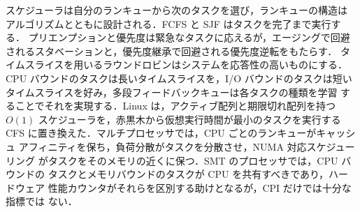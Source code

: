 \documentclass[../main.tex]{subfiles}
\begin{document}
\begin{keypoint}[章のまとめ]
  スケジューラは自分のランキューから次のタスクを選び，ランキューの構造は
  アルゴリズムとともに設計される．FCFS と SJF はタスクを完了まで実行する．
  プリエンプションと優先度は緊急なタスクに応えるが，エージングで回避
  されるスタベーションと，優先度継承で回避される優先度逆転をもたらす．
  タイムスライスを用いるラウンドロビンはシステムを応答性の高いものにする．
  CPU バウンドのタスクは長いタイムスライスを，I/O バウンドのタスクは短い
  タイムスライスを好み，多段フィードバックキューは各タスクの種類を学習
  することでそれを実現する．Linux は，アクティブ配列と期限切れ配列を持つ
  $O(1)$ スケジューラを，赤黒木から仮想実行時間が最小のタスクを実行する
  CFS に置き換えた．マルチプロセッサでは，CPU ごとのランキューがキャッシュ
  アフィニティを保ち，負荷分散がタスクを分散させ，NUMA 対応スケジューリング
  がタスクをそのメモリの近くに保つ．SMT のプロセッサでは，CPU バウンドの
  タスクとメモリバウンドのタスクが CPU を共有すべきであり，ハードウェア
  性能カウンタがそれらを区別する助けとなるが，CPI だけでは十分な指標では
  ない．
\end{keypoint}
\end{document}

